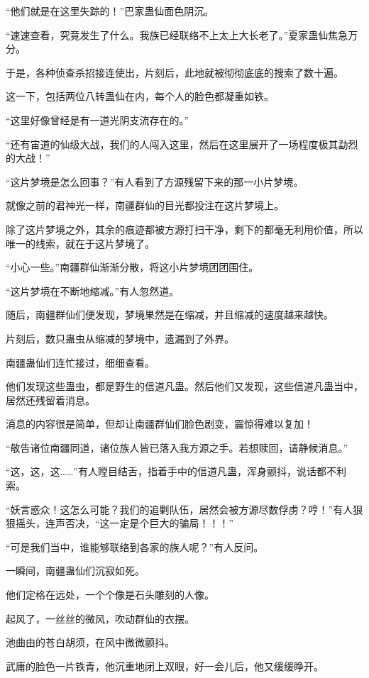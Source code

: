 \begin{this_body}
“他们就是在这里失踪的！”巴家蛊仙面色阴沉。

“速速查看，究竟发生了什么。我族已经联络不上太上大长老了。”夏家蛊仙焦急万分。

于是，各种侦查杀招接连使出，片刻后，此地就被彻彻底底的搜索了数十遍。

这一下，包括两位八转蛊仙在内，每个人的脸色都凝重如铁。

“这里好像曾经是有一道光阴支流存在的。”

“还有宙道的仙级大战，我们的人闯入这里，然后在这里展开了一场程度极其勐烈的大战！”

“这片梦境是怎么回事？”有人看到了方源残留下来的那一小片梦境。

就像之前的君神光一样，南疆群仙的目光都投注在这片梦境上。

除了这片梦境之外，其余的痕迹都被方源打扫干净，剩下的都毫无利用价值，所以唯一的线索，就在于这片梦境了。

“小心一些。”南疆群仙渐渐分散，将这小片梦境团团围住。

“这片梦境在不断地缩减。”有人忽然道。

随后，南疆群仙们便发现，梦境果然是在缩减，并且缩减的速度越来越快。

片刻后，数只蛊虫从缩减的梦境中，遗漏到了外界。

南疆蛊仙们连忙接过，细细查看。

他们发现这些蛊虫，都是野生的信道凡蛊。然后他们又发现，这些信道凡蛊当中，居然还残留着消息。

消息的内容很是简单，但却让南疆群仙们脸色剧变，震惊得难以复加！

“敬告诸位南疆同道，诸位族人皆已落入我方源之手。若想赎回，请静候消息。”

“这，这，这……”有人瞠目结舌，指着手中的信道凡蛊，浑身颤抖，说话都不利索。

“妖言惑众！这怎么可能？我们的追剿队伍，居然会被方源尽数俘虏？哼！”有人狠狠摇头，连声否决，“这一定是个巨大的骗局！！！”

“可是我们当中，谁能够联络到各家的族人呢？”有人反问。

一瞬间，南疆蛊仙们沉寂如死。

他们定格在远处，一个个像是石头雕刻的人像。

起风了，一丝丝的微风，吹动群仙的衣摆。

池曲由的苍白胡须，在风中微微颤抖。

武庸的脸色一片铁青，他沉重地闭上双眼，好一会儿后，他又缓缓睁开。


\end{this_body}
